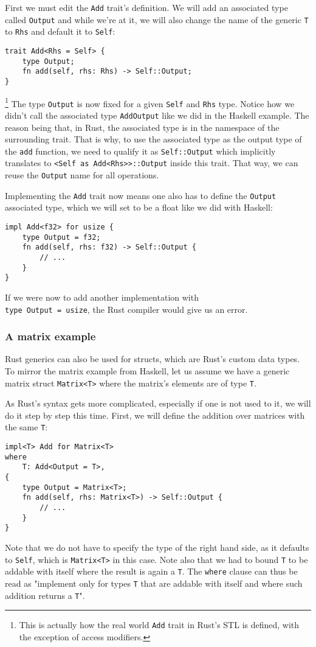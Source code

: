 First we must edit the \verb|Add| trait's definition. We will add an associated type called \verb|Output| and while we're at it, we will also change the name of the generic \verb|T| to \verb|Rhs| and default it to \verb|Self|:
\begin{verbatim}
trait Add<Rhs = Self> {
    type Output;
    fn add(self, rhs: Rhs) -> Self::Output;
}
\end{verbatim}
\footnote{This is actually how the real world \verb|Add| trait in Rust's STL is defined, with the exception of access modifiers.}
The type \verb|Output| is now fixed for a given \verb|Self| and \verb|Rhs| type. Notice how we didn't call the associated type \verb|AddOutput| like we did in the Haskell example. The reason being that, in Rust, the associated type is in the namespace of the surrounding trait. That is why, to use the associated type as the output type of the \verb|add| function, we need to qualify it as \verb|Self::Output| which implicitly translates to \verb|<Self as Add<Rhs>>::Output| inside this trait. That way, we can reuse the \verb|Output| name for all operations.

Implementing the \verb|Add| trait now means one also has to define the \verb|Output| associated type, which we will set to be a float like we did with Haskell:
\begin{verbatim}
impl Add<f32> for usize {
    type Output = f32;
    fn add(self, rhs: f32) -> Self::Output {
        // ...
    }
}
\end{verbatim}
If we were now to add another implementation with \\ \verb|type Output = usize|, the Rust compiler would give us an error.

\subsubsection{A matrix example}

Rust generics can also be used for structs, which are Rust's custom data types. To mirror the matrix example from Haskell, let us assume we have a generic matrix struct \verb|Matrix<T>| where the matrix's elements are of type \verb|T|.

As Rust's syntax gets more complicated, especially if one is not used to it, we will do it step by step this time. First, we will define the addition over matrices with the same \verb|T|:
\begin{verbatim}
impl<T> Add for Matrix<T>
where
    T: Add<Output = T>,
{
    type Output = Matrix<T>;
    fn add(self, rhs: Matrix<T>) -> Self::Output {
        // ...
    }
}
\end{verbatim}
Note that we do not have to specify the type of the right hand side, as it defaults to \verb|Self|, which is \verb|Matrix<T>| in this case. Note also that we had to bound \verb|T| to be addable with itself where the result is again a \verb|T|. The \verb|where| clause can thus be read as "implement only for types \verb|T| that are addable with itself and where such addition returns a \verb|T|".

